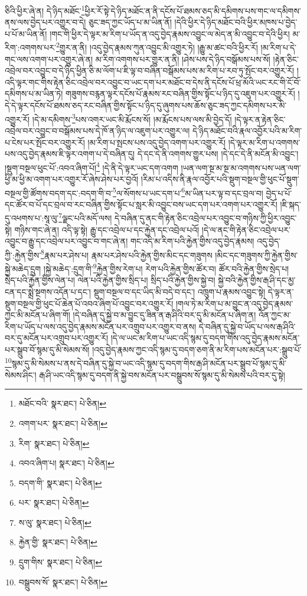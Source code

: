 ཅིའི་ཕྱིར་ཞེ་ན། དེ་ཉིད་མཐོང་\footnote{མཐོང་བའི་  སྣར་ཐང་།  པེ་ཅིན། }ཕྱིར་རོ་སྟེ་དེ་ཉིད་མཐོང་ན་ནི་དངོས་པོ་ཐམས་ཅད་མི་དམིགས་པས་གང་ལ་དམིགས་ནས་ལས་བྱེད་པར་འགྱུར་བ་དེ། ཅུང་ཟད་ཀྱང་ཡོད་པ་མ་ཡིན་ནོ། །དེའི་ཕྱིར་དེ་ཉིད་མཐོང་བའི་ཕྱིར་མཁས་པ་བྱེད་པ་པོ་མ་ཡིན་ནོ། །གང་གི་ཕྱིར་དེ་ལྟར་མ་རིག་པ་ཡོད་ན་འདུ་བྱེད་རྣམས་འབྱུང་ལ་མེད་ན་མི་འབྱུང་བ་དེའི་ཕྱིར། མ་རིག་:འགགས་པར་\footnote{འགག་པར་  སྣར་ཐང་།  པེ་ཅིན། }གྱུར་ན་ནི། །འདུ་བྱེད་རྣམས་ཀུན་འབྱུང་མི་འགྱུར་ཏེ། །རྒྱུ་མ་ཚང་བའི་ཕྱིར་རོ། །མ་རིག་པ་དེ་གང་ལས་འགག་པར་འགྱུར་ཞེ་ན། མ་རིག་འགགས་པར་གྱུར་ན་ནི། །ཤེས་པས་དེ་ཉིད་བསྒོམས་པས་སོ། །རྟེན་ཅིང་འབྲེལ་བར་འབྱུང་བ་དེ་ཉིད་ཕྱིན་ཅི་མ་ལོག་པ་ཇི་ལྟ་བ་བཞིན་བསྒོམས་པས་མ་རིག་པ་རབ་ཏུ་སྤོང་བར་འགྱུར་རོ། །འདི་ལྟར་གང་གིས་རྟེན་ཅིང་འབྲེལ་བར་འབྱུང་བ་ཡང་དག་པར་མཐོང་བ་དེས་ནི་དངོས་པོ་ཕྲ་མོའི་ཡང་རང་གི་ངོ་བོ་དམིགས་པ་མ་ཡིན་ཏེ། གཟུགས་བརྙན་ལྟར་དངོས་པོ་རྣམས་རང་བཞིན་གྱིས་སྟོང་པ་ཉིད་དུ་འཇུག་པར་འགྱུར་རོ། །དེ་དེ་ལྟར་དངོས་པོ་ཐམས་ཅད་རང་བཞིན་གྱིས་སྟོང་པ་ཉིད་དུ་ཞུགས་པས་ཆོས་ཅུང་ཟད་ཀྱང་དམིགས་པར་མི་འགྱུར་རོ། །དེ་མ་དམིགས་\footnote{རིག་  སྣར་ཐང་།  པེ་ཅིན། }པས་འགར་ཡང་མི་རྨོངས་སོ། །མ་རྨོངས་པས་ལས་མི་བྱེད་དོ། །དེ་ལྟར་ན་རྟེན་ཅིང་འབྲེལ་བར་འབྱུང་བ་བསྒོམས་པས་དེ་ཁོ་ན་ཉིད་ལ་འཇུག་པར་འགྱུར་ལ། དེ་ཉིད་མཐོང་བའི་རྣལ་འབྱོར་པའི་མ་རིག་པ་ངེས་པར་སྤོང་བར་འགྱུར་རོ། །མ་རིག་པ་སྤངས་པས་འདུ་བྱེད་འགག་པར་འགྱུར་རོ། །དེ་ལྟར་མ་རིག་པ་འགགས་པས་འདུ་བྱེད་རྣམས་ཇི་ལྟར་འགག་པ་དེ་བཞིན་དུ། དེ་དང་དེ་ནི་འགགས་གྱུར་པས། །དེ་དང་དེ་ནི་མངོན་མི་འབྱུང་། །སྡུག་བསྔལ་ཕུང་པོ་:འབའ་ཞིག་པོ།\footnote{འབའ་ཞིག་པ།  སྣར་ཐང་།  པེ་ཅིན། } །དེ་ནི་དེ་ལྟར་ཡང་དག་འགག །ཡན་ལག་སྔ་མ་སྔ་མ་འགགས་པས་ཡན་ལག་ཕྱི་མ་ཕྱི་མ་འགག་པར་འགྱུར་རོ་ཞེས་ཤེས་པར་བྱའོ། །རིམ་པ་འདིས་ནི་རྣལ་འབྱོར་པའི་སྡུག་བསྔལ་གྱི་ཕུང་པོ་སྡུག་བསྔལ་གྱི་ཚོགས་བདག་དང་:བདག་གི་བ་\footnote{བདག་གི་  སྣར་ཐང་།  པེ་ཅིན། }ལ་སོགས་པ་ཡང་དག་པ་\footnote{པར་  སྣར་ཐང་།  པེ་ཅིན། }མ་ཡིན་པར་ལྟ་བ་དང་བྲལ་བ། བྱེད་པ་པོ་དང་ཚོར་བ་པོ་དང་བྲལ་བ་རང་བཞིན་གྱིས་སྟོང་པ་སླར་མི་འབྱུང་བས་ཡང་དག་པར་འགག་པར་འགྱུར་རོ། །ཇི་སྐད་དུ་འཕགས་པ་:སཱ་ལུ་\footnote{ས་ལུ་  སྣར་ཐང་།  པེ་ཅིན། }ལྗང་པའི་མདོ་ལས། དེ་བཞིན་དུ་ནང་གི་རྟེན་ཅིང་འབྲེལ་པར་འབྱུང་བ་གཉིས་ཀྱི་ཕྱིར་འབྱུང་སྟེ། གཉིས་གང་ཞེ་ན། འདི་ལྟ་སྟེ། རྒྱུ་དང་འབྲེལ་པ་དང་རྐྱེན་དང་འབྲེལ་པའོ། །དེ་ལ་ནང་གི་རྟེན་ཅིང་འབྲེལ་པར་འབྱུང་བ་རྒྱུ་དང་འབྲེལ་པར་འབྱུང་བ་གང་ཞེ་ན། གང་འདི་མ་རིག་པའི་རྐྱེན་གྱིས་འདུ་བྱེད་རྣམས། འདུ་བྱེད་ཀྱི་:རྐྱེན་གྱིས་\footnote{རྐྱེན་གྱི་  སྣར་ཐང་།  པེ་ཅིན། }རྣམ་པར་ཤེས་པ། རྣམ་པར་ཤེས་པའི་རྐྱེན་གྱིས་མིང་དང་གཟུགས །མིང་དང་གཟུགས་ཀྱི་རྐྱེན་གྱིས་སྐྱེ་མཆེད་དྲུག །སྐྱེ་མཆེད་:དྲུག་གི་\footnote{དྲུག་གིས་  སྣར་ཐང་།  པེ་ཅིན། }རྐྱེན་གྱིས་རེག་པ། རེག་པའི་རྐྱེན་གྱིས་ཚོར་བ། ཚོར་བའི་རྐྱེན་གྱིས་སྲེད་པ། སྲེད་པའི་རྐྱེན་གྱིས་ལེན་པ། ལེན་པའི་རྐྱེན་གྱིས་སྲིད་པ། སྲིད་པའི་རྐྱེན་གྱིས་སྐྱེ་བ། སྐྱེ་བའི་རྐྱེན་གྱིས་རྒ་ཤི་དང་མྱ་ངན་དང་སྨྲེ་སྔགས་འདོན་པ་དང་། སྡུག་བསྔལ་བ་དང་ཡིད་མི་བདེ་བ་དང་། འཁྲུག་པ་རྣམས་འབྱུང་སྟེ། དེ་ལྟར་ན་སྡུག་བསྔལ་གྱི་ཕུང་པོ་ཆེན་པོ་འབའ་ཞིག་པོ་འབྱུང་བར་འགྱུར་རོ། །གལ་ཏེ་མ་རིག་པ་མ་བྱུང་ན་འདུ་བྱེད་རྣམས་ཀྱང་མི་མངོན་པ་ཞིག་གོ། །དེ་བཞིན་དུ་སྐྱེ་བ་མ་བྱུང་དུ་ཟིན་ན་རྒ་ཤིའི་བར་དུ་མི་མངོན་པ་ཞིག་ན། འོན་ཀྱང་མ་རིག་པ་ཡོད་པ་ལས་འདུ་བྱེད་རྣམས་མངོན་པར་འགྲུབ་པར་འགྱུར་བ་ནས། དེ་བཞིན་དུ་སྐྱེ་བ་ཡོད་པ་ལས་རྒ་ཤིའི་བར་དུ་མངོན་པར་འགྲུབ་པར་འགྱུར་རོ། །དེ་ལ་ཡང་མ་རིག་པ་ཡང་འདི་སྙམ་དུ་བདག་གིས་འདུ་བྱེད་རྣམས་མངོན་པར་སྒྲུབ་བོ་སྙམ་དུ་མི་སེམས་སོ། །འདུ་བྱེད་རྣམས་ཀྱང་འདི་སྙམ་དུ་བདག་ཅག་ནི་མ་རིག་པས་མངོན་པར་:སྒྲུབ་པོ་\footnote{བསྒྲུབས་སོ་  སྣར་ཐང་།  པེ་ཅིན། }སྙམ་དུ་མི་སེམས་པ་ནས་དེ་བཞིན་དུ་སྐྱེ་བ་ཡང་འདི་སྙམ་དུ་བདག་གིས་རྒ་ཤི་མངོན་པར་སྒྲུབ་པོ་སྙམ་དུ་མི་སེམས་ཤིང་། རྒ་ཤི་ཡང་འདི་སྙམ་དུ་བདག་ནི་སྐྱེ་བས་མངོན་པར་བསྒྲུབས་སོ་སྙམ་དུ་མི་སེམས་པའི་བར་དུ་སྟེ། 